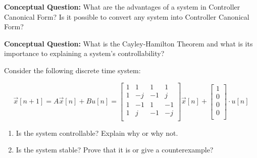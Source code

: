 
\begin{enumerate}

\qitem \textbf{Conceptual Question:} What are the advantages of a system in Controller Canonical Form? Is it possible to convert any system into Controller Canonical Form?

\qitem \textbf{Conceptual Question:} What is the Cayley-Hamilton Theorem and what is its importance to explaining a system's controllability?




\qitem Consider the following discrete time system:

$$\vec{x}[n+1] = A\vec{x}[n] + Bu[n] = \begin{bmatrix}
1 & 1 & 1 & 1 \\
1 & -j & -1 & j \\
1 & -1 & 1 & -1 \\
1 & j & -1 & -j \\
\end{bmatrix} \vec{x}[n] + \begin{bmatrix}
1 \\
0 \\
0 \\
0 \\
\end{bmatrix} \cdot u[n]
$$

\begin{enumerate}
	\item Is the system controllable? Explain why or why not.
	\item Is the system stable? Prove that it is or give a counterexample?
\end{enumerate}

\end{enumerate}
